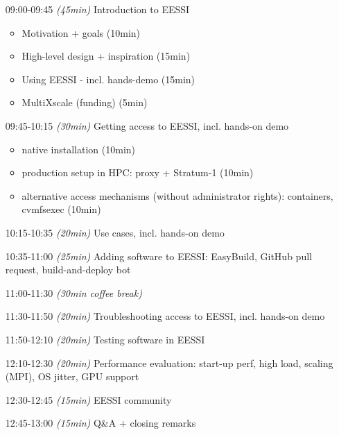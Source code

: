 \begin{itemize}[style=standard, labelwidth=1.9cm]


    \item [09:00-09:45] \emph{(45min)} Introduction to EESSI
    \begin{itemize}
        \item Motivation + goals (10min)
        \item High-level design + inspiration (15min)
        \item Using EESSI - incl. hands-demo (15min)
        \item MultiXscale (funding) (5min)
    \end{itemize}
    \item [09:45-10:15] \emph{(30min)} Getting access to EESSI, incl. hands-on demo
    \begin{itemize}
        \item native installation (10min)
        \item production setup in HPC: proxy + Stratum-1 (10min)
        \item alternative access mechanisms (without administrator rights): containers, cvmfsexec (10min)
    \end{itemize}
    \item [10:15-10:35] \emph{(20min)} Use cases, incl. hands-on demo
    \item [10:35-11:00] \emph{(25min)} Adding software to EESSI: EasyBuild, GitHub pull request, build-and-deploy bot
    \item [11:00-11:30] \emph{(30min coffee break)}
    \item [11:30-11:50] \emph{(20min)} Troubleshooting access to EESSI, incl. hands-on demo
    \item [11:50-12:10] \emph{(20min)} Testing software in EESSI
    \item [12:10-12:30] \emph{(20min)} Performance evaluation: start-up perf, high load, scaling (MPI), OS jitter, GPU support
    \item [12:30-12:45] \emph{(15min)} EESSI community
    \item [12:45-13:00] \emph{(15min)} Q\&A + closing remarks

\end{itemize}

